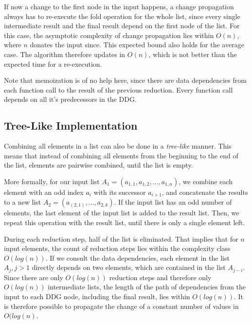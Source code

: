 If now a change to the first node in the input happens, a change propagation always has to re-execute the fold operation for the whole list, since every single intermediate result and the final result depend on the first node of the list. For this case, the asymptotic complexity of change propagation lies within $O(n)$, where $n$ donates the input since. This expected bound also holds for the average case. The algorithm therefore updates in $O(n)$, which is not better than the expected time for a re-execution. 

Note that memoization is of no help here, since there are data dependencies from each function call to the result of the previous reduction. Every function call depends on all it's predecessors in the DDG.

\subsection{Tree-Like Implementation}

Combining all elements in a list can also be done in a \textit{tree-like} manner. This means that instead of combining all elements from the beginning to the end of the list, elements are pairwise combined, until the list is empty. 

More formally, for our input list $A_1 = (a_{1, 1}, a_{1, 2}, ..., a_{1, n})$, we combine each element with an odd index $a_i$ with its successor $a_{i + 1}$, and concatenate the results to a new list $A_2 = (a_{(2, 1)}, ..., a_{2, k})$. If the input list has an odd number of elements, the last element of the input list is added to the result list. Then, we repeat this operation with the result list, until there is only a single element left.

During each reduction step, half of the list is eliminated. That implies that for $n$ input elements, the count of reduction steps lies within the complexity class $O(log(n))$. If we consult the data dependencies, each element in the list $A_j, j > 1$ directly depends on two elements, which are contained in the list $A_{j - i}$. Since there are only $O(log(n))$ reduction steps and therefore only $O(log(n))$ intermediate lists, the length of the path of dependencies from the input to each DDG node, including the final result, lies within $O(log(n))$. It is therefore possible to propagate the change of a constant number of values in $O(log(n)$. 

